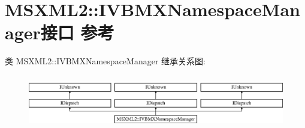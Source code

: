 \hypertarget{interface_m_s_x_m_l2_1_1_i_v_b_m_x_namespace_manager}{}\section{M\+S\+X\+M\+L2\+:\+:I\+V\+B\+M\+X\+Namespace\+Manager接口 参考}
\label{interface_m_s_x_m_l2_1_1_i_v_b_m_x_namespace_manager}
类 M\+S\+X\+M\+L2\+:\+:I\+V\+B\+M\+X\+Namespace\+Manager 继承关系图\+:\begin{figure}[H]
\begin{center}
\leavevmode
\includegraphics[height=2.372881cm]{interface_m_s_x_m_l2_1_1_i_v_b_m_x_namespace_manager}
\end{center}
\end{figure}
